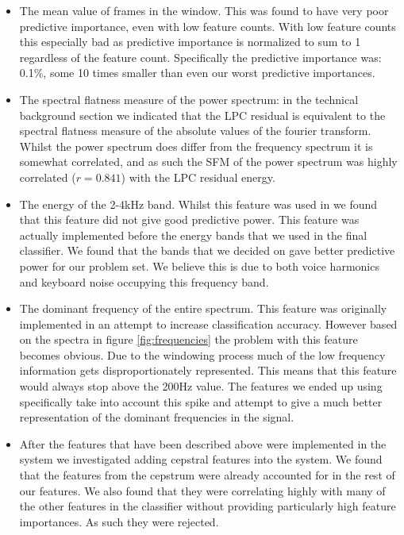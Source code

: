 \documentclass[ %
                    author={Sam Phippen},
                supervisor={Dr. Rafal Bogacz},
                     title={Real time voice activity detectors in noisy personal computing environments},
                  subtitle={},
                    degree={MEng},
                      year={2012} ]{thesis}
\begin{document}
\begin{itemize}

    \item The mean value of frames in the window. This was found to have very
        poor predictive importance, even with low feature counts. With low
        feature counts this especially bad as predictive importance is
        normalized to sum to 1 regardless of the feature count. Specifically
        the predictive importance was: 0.1\%, some 10 times smaller than even
        our worst predictive importances.

    \item The spectral flatness measure of the power spectrum: in the technical
        background section we indicated that the LPC residual is equivalent to
        the spectral flatness measure of the absolute values of the fourier
        transform. Whilst the power spectrum does differ from the frequency
        spectrum it is somewhat correlated, and as such the SFM of the power
        spectrum was highly correlated ($r=0.841$) with the LPC residual energy.

    \item The energy of the 2-4kHz band. Whilst this feature was used in
        \cite{shin} we found that this feature did not give good predictive
        power. This feature was actually implemented before the energy bands
        that we used in the final classifier. We found that the bands that we
        decided on gave better predictive power for our problem set. We believe
        this is due to both voice harmonics and keyboard noise occupying this
        frequency band.

    \item The dominant frequency of the entire spectrum. This feature was
        originally implemented in an attempt to increase classification
        accuracy. However based on the spectra in figure \ref{fig:frequencies}
        the problem with this feature becomes obvious. Due to the windowing
        process much of the low frequency information gets disproportionately
        represented. This means that this feature would always stop above the
        200Hz value. The features we ended up using specifically take into
        account this spike and attempt to give a much better representation of
        the dominant frequencies in the signal.

    \item After the features that have been described above were implemented in
        the system we investigated adding cepstral features into the system. We
        found that the features from the cepstrum were already accounted for in
        the rest of our features. We also found that they were correlating
        highly with many of the other features in the classifier without
        providing particularly high feature importances. As such they were
        rejected.

    \end{itemize}
\end{document}

